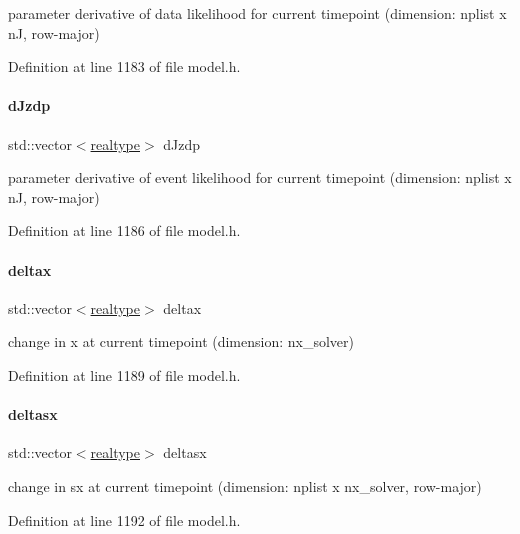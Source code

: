 parameter derivative of data likelihood for current timepoint (dimension\+: nplist x nJ, row-\/major) 

Definition at line 1183 of file model.\+h.

\mbox{\label{classamici_1_1_model_a0a3bc96cfcf3d3469d9351f8759191b1}} 
\paragraph{\texorpdfstring{dJzdp}{dJzdp}}
{\footnotesize\ttfamily std\+::vector$<$\mbox{\hyperlink{namespaceamici_a1bdce28051d6a53868f7ccbf5f2c14a3}{realtype}}$>$ d\+Jzdp}

parameter derivative of event likelihood for current timepoint (dimension\+: nplist x nJ, row-\/major) 

Definition at line 1186 of file model.\+h.

\mbox{\label{classamici_1_1_model_ab259d30491631b3ad9fcf84f4f84da75}} 
\paragraph{\texorpdfstring{deltax}{deltax}}
{\footnotesize\ttfamily std\+::vector$<$\mbox{\hyperlink{namespaceamici_a1bdce28051d6a53868f7ccbf5f2c14a3}{realtype}}$>$ deltax}

change in x at current timepoint (dimension\+: nx\+\_\+solver) 

Definition at line 1189 of file model.\+h.

\mbox{\label{classamici_1_1_model_a3be615f0dfbef0fb7bee840abde04459}} 
\paragraph{\texorpdfstring{deltasx}{deltasx}}
{\footnotesize\ttfamily std\+::vector$<$\mbox{\hyperlink{namespaceamici_a1bdce28051d6a53868f7ccbf5f2c14a3}{realtype}}$>$ deltasx}

change in sx at current timepoint (dimension\+: nplist x nx\+\_\+solver, row-\/major) 

Definition at line 1192 of file model.\+h.

